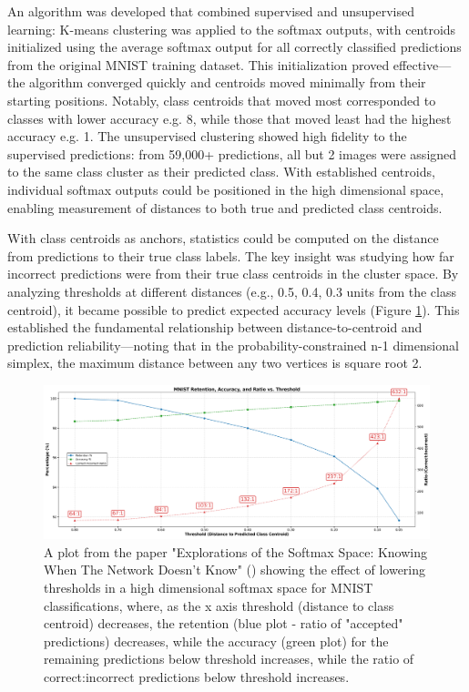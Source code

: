 An algorithm was developed that combined supervised and unsupervised learning: K-means clustering was applied to the softmax outputs, with centroids initialized using the average softmax output for all correctly classified predictions from the original MNIST training dataset. This initialization proved effective—the algorithm converged quickly and centroids moved minimally from their starting positions. Notably, class centroids that moved most corresponded to classes with lower accuracy e.g. 8, while those that moved least had the highest accuracy e.g. 1.
The unsupervised clustering showed high fidelity to the supervised predictions: from 59,000+ predictions, all but 2 images were assigned to the same class cluster as their predicted class. With established centroids, individual softmax outputs could be positioned in the high dimensional space, enabling measurement of distances to both true and predicted class centroids.

With class centroids as anchors, statistics could be computed on the distance from predictions to their true class labels. The key insight was studying how far incorrect predictions were from their true class centroids in the cluster space. By analyzing thresholds at different distances (e.g., 0.5, 0.4, 0.3 units from the class centroid), it became possible to predict expected accuracy levels (Figure \ref{fig:MNIST_TRAINING_DATASET_ACC_RATIO_VS_THRESHOLD}). This established the fundamental relationship between distance-to-centroid and prediction reliability—noting that in the probability-constrained n-1 dimensional simplex, the maximum distance between any two vertices is square root 2.

\begin{figure}[ht!]
    \centering
    \includegraphics[width=0.99\columnwidth]{Figures/Methods/mnist_retention_accuracy_ratio_vs_threshold.png}
    \caption{A plot from the paper "Explorations of the Softmax Space: Knowing When The Network Doesn't Know" (\cite{sikar2025explorationssoftmaxspaceknowing}) showing the effect of lowering thresholds in a high dimensional softmax space for MNIST classifications, where, as the x axis threshold (distance to class centroid) decreases, the retention (blue plot - ratio of "accepted" predictions) decreases, while the accuracy (green plot) for the remaining predictions below threshold increases, while the ratio of correct:incorrect predictions below threshold increases.}
\label{fig:MNIST_TRAINING_DATASET_ACC_RATIO_VS_THRESHOLD}
\end{figure}


